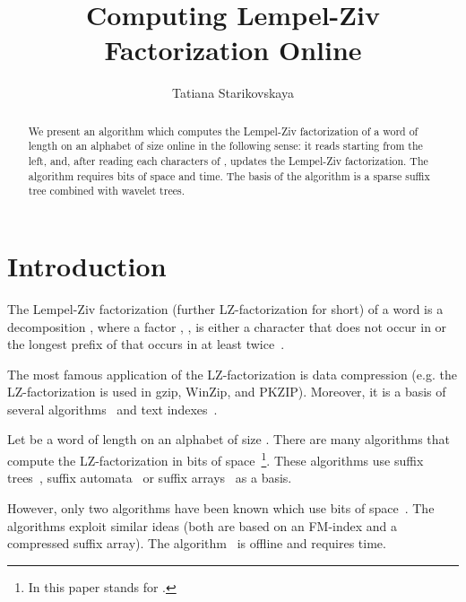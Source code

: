 \documentclass[10pt]{llncs}
\begin{document}
\title{Computing Lempel-Ziv Factorization Online}


\author
{
   Tatiana Starikovskaya
}
\date{\empty}
\maketitle

\begin{abstract}
We present an algorithm which computes the Lempel-Ziv factorization of a word  of length  on an alphabet  of size  online in the following sense: it reads  starting from the left, and, after reading each  characters of , updates the Lempel-Ziv factorization. The algorithm requires  bits of space and  time. The basis of the algorithm is a sparse suffix tree combined with wavelet trees.
\end{abstract}

\section{Introduction}
The Lempel-Ziv factorization (further LZ-factorization for short) of a word  is a decomposition , where a factor , , is either a character that does not occur in  or the longest prefix of  that occurs in  at least twice~\cite{Crochemore:1986:TR:21537.21539,Ziv77auniversal}.

The most famous application of the LZ-factorization is data compression (e.g. the LZ-factorization is used in gzip, WinZip, and PKZIP). Moreover, it is a basis of several algorithms~\cite{Kolpakov99findingmaximal,Gusfield:2004:LTA:1046081.1046083} and text indexes~\cite{Kreft:2011:SBL:2018243.2018251}.

Let  be a word of length  on an alphabet  of size . There are many algorithms that compute the LZ-factorization in  bits of space~\footnote{In this paper  stands for .}. These algorithms use suffix trees~\cite{Rodeh:1981:LAD:322234.322237}, suffix automata~\cite{Crochemore:1986:TR:21537.21539} or suffix arrays~\cite{Abouelhoda:2004:RST:985384.985389,journals/mics/ChenPS08,Crochemore:2008:CLP:1346353.1346507,conf/iwoca/CrochemoreIIKRW09,Crochemore:2008:SAC:1395764.1395899,Ohlebusch:2011:LFR:2018243.2018249} as a basis.

However, only two algorithms have been known which use  bits of space~\cite{Okanohara:2008:OAF:1431008.1431068,Ohlebusch:2011:LFR:2018243.2018249}. The algorithms exploit similar ideas (both are based on an FM-index and a compressed suffix array). The algorithm~\cite{Ohlebusch:2011:LFR:2018243.2018249} is offline and requires  time.
\end{document}
